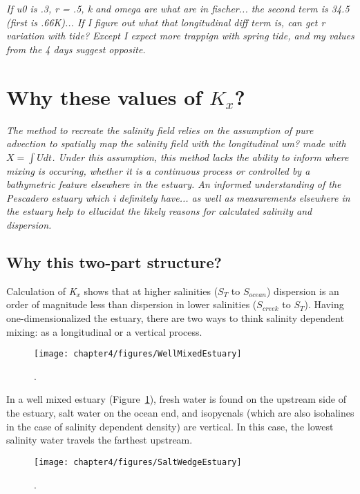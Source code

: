 \emph{If u0 is .3, r = .5, k and omega are what are in fischer... the second term is 34.5 (first is .66K)... If I figure out what that longitudinal diff term is, can get r variation with tide? Except I expect more trappign with spring tide, and my values from the 4 days suggest opposite.}


\section{Why these values of $K_x$?}

\emph{The method to recreate the salinity field relies on the assumption of pure advection to spatially map the salinity field with the longitudinal \emph{um?} made with $X = \int{U}dt$. Under this assumption, this method lacks the ability to inform where mixing is occuring, whether it is a continuous process or controlled by a bathymetric feature elsewhere in the estuary. An informed understanding of the Pescadero estuary \emph{which i definitely have...} as well as measurements elsewhere in the estuary help to ellucidat the likely reasons for \emph{calculated} salinity and dispersion.}

\subsection{Why this two-part structure?}

Calculation of \emph{K$_x$} shows that at higher salinities ($S_T$ to $S_{ocean}$) dispersion is an order of magnitude less than dispersion in lower salinities ($S_{creek}$ to $S_T$). Having one-dimensionalized the estuary, there are two ways to think salinity dependent mixing: as a longitudinal or a vertical process. 

\begin{figure}[h]
\centering
	\texttt{[image: chapter4/figures/WellMixedEstuary]}
	\caption{.} \label{fig:WellMixedEstuary}
\end{figure}

In a well mixed estuary (Figure~\ref{fig:WellMixedEstuary}), fresh water is found on the upstream side of the estuary, salt water on the ocean end, and isopycnals (which are also isohalines in the case of salinity dependent density) are vertical. In this case, the lowest salinity water travels the farthest upstream.

\begin{figure}[h]
\centering
	\texttt{[image: chapter4/figures/SaltWedgeEstuary]}
	\caption{.} \label{fig:SaltWedgeEstuary}
\end{figure}


